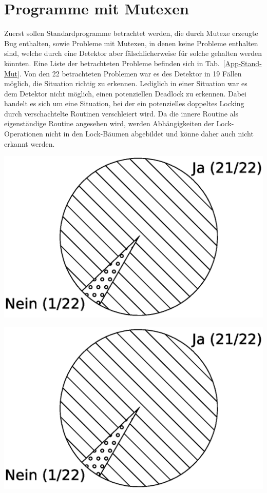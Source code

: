 \section{Programme mit Mutexen}
Zuerst sollen Standardprogramme betrachtet werden, die durch Mutexe erzeugte 
Bug enthalten, sowie Probleme mit Mutexen, in denen keine Probleme enthalten 
sind, welche durch eine Detektor aber fälschlicherweise für solche gehalten werden 
könnten. Eine Liste der betrachteten Probleme befinden sich in 
Tab.~\ref{App-Stand-Mut}. Von den 22 betrachteten Problemen war es des 
Detektor in 19 Fällen möglich, die Situation richtig zu erkennen. Lediglich 
in einer Situation war es dem Detektor nicht möglich, einen potenziellen 
Deadlock zu erkennen. Dabei handelt es sich um eine Situation, bei der 
ein potenzielles doppeltes Locking durch verschachtelte Routinen verschleiert 
wird. Da die innere Routine als eigenständige Routine angesehen wird, 
werden Abhängigkeiten der Lock-Operationen nicht in den Lock-Bäumen abgebildet 
und könne daher auch nicht erkannt werden. \\
\begin{minipage}{0.45\textwidth}
  \centering  
  \includegraphics[width=\textwidth]{img/pi_standart_mutex.eps}
  \label{Chap:Tracer-Sec:Laufzeit-Img:LaufzeitInstrumenter}
\end{minipage}
\hfill
\begin{minipage}{0.45\textwidth}
  \centering
  \includegraphics[width=\textwidth]{img/pi_standart_mutex.eps}
  \label{Chap:Trace-Sec:Laufzeit-Img:LaufzeitTracer}
\end{minipage}

